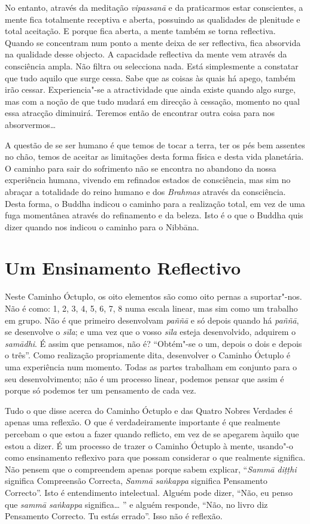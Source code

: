 No entanto, através da meditação \emph{vipassanā} e da praticarmos estar conscientes,
a mente fica totalmente receptiva e aberta, possuindo as qualidades de plenitude
e total aceitação. E porque fica aberta, a mente também se torna reflectiva.
Quando se concentram num ponto a mente deixa de ser reflectiva, fica absorvida
na qualidade desse objecto. A capacidade reflectiva da mente vem através da
consciência ampla. Não filtra ou selecciona nada. Está simplesmente a constatar que
tudo aquilo que surge cessa. Sabe que as coisas às quais há apego, também irão cessar. Experiencia"-se a atractividade que ainda existe quando algo surge, mas com a noção de que tudo mudará em direcção à cessação, momento no qual essa atracção diminuirá. Teremos então
de encontrar outra coisa para nos absorvermos\ldots{}

A questão de se ser humano é que temos de tocar a terra, ter os pés bem assentes
no chão, temos de aceitar as limitações desta forma física e desta vida
planetária. O caminho para sair do sofrimento não se encontra no abandono da
nossa experiência humana, vivendo em refinados estados de consciência, mas sim no
abraçar a totalidade do reino humano e dos \emph{Brahmas} através da consciência. Desta forma, o Buddha indicou o caminho para a realização total, em vez
de uma fuga momentânea através do refinamento e da beleza. Isto é o que o Buddha
quis dizer quando nos indicou o caminho para o Nibbāna.

\section{Um Ensinamento Reflectivo}

Neste Caminho Óctuplo, os oito elementos são como oito pernas a suportar"-nos.
Não é como: 1, 2, 3, 4, 5, 6, 7, 8 numa escala linear, mas sim como um trabalho
em grupo. Não é que primeiro desenvolvam \emph{paññā} e só depois quando há
\emph{paññā}, se desenvolve o \emph{sīla}; e uma vez que o vosso \emph{sīla}
esteja desenvolvido, adquirem o \emph{samādhi}. É assim que pensamos, não é?
“Obtém"-se o um, depois o dois e depois o três”. Como realização propriamente
dita, desenvolver o Caminho Óctuplo é uma experiência num momento. Todas as
partes trabalham em conjunto para o seu desenvolvimento; não é um processo
linear, podemos pensar que assim é porque só podemos ter um pensamento de cada
vez.

Tudo o que disse acerca do Caminho Óctuplo e das Quatro Nobres Verdades é apenas
uma reflexão. O que é verdadeiramente importante é que realmente percebam o que
estou a fazer quando reflicto, em vez de se apegarem àquilo que estou a dizer. É
um processo de trazer o Caminho Óctuplo à mente, usando"-o como ensinamento
reflexivo para que possam considerar o que realmente significa. Não pensem que o
compreendem apenas porque sabem explicar, “\emph{Sammā diṭṭhi} significa
Compreensão Correcta, \emph{Sammā saṅkappa} significa Pensamento Correcto”.
Isto é entendimento intelectual. Alguém pode dizer, “Não, eu penso que
\emph{sammā saṅkappa} significa\ldots{} ” e alguém responde, “Não, no livro diz
Pensamento Correcto. Tu estás errado”. Isso não é reflexão.

